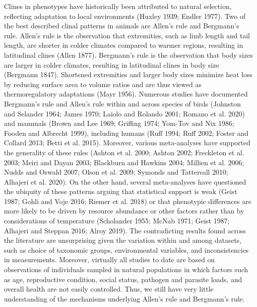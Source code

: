 \documentclass[
]{article}
\begin{document}
Clines in phenotypes have historically been attributed to natural
selection, reflecting adaptation to local environments (Huxley 1939;
Endler 1977). Two of the best described clinal patterns in animals are
Allen's rule and Bergmann's rule. Allen's rule is the observation that
extremities, such as limb length and tail length, are shorter in colder
climates compared to warmer regions, resulting in latitudinal clines
(Allen 1877). Bergmann's rule is the observation that body sizes are
larger in colder climates, resulting in latitudinal clines in body size
(Bergmann 1847). Shortened extremities and larger body sizes minimize
heat loss by reducing surface area to volume ratios and are thus viewed
as thermoregulatory adaptations (Mayr 1956). Numerous studies have
documented Bergmann's rule and Allen's rule within and across species of
birds (Johnston and Selander 1964; James 1970; Laiolo and Rolando 2001;
Romano et al. 2020) and mammals (Brown and Lee 1969; Griffing 1974;
Yom-Tov and Nix 1986; Fooden and Albrecht 1999), including humans (Ruff
1994; Ruff 2002; Foster and Collard 2013; Betti et al. 2015). Moreover,
various meta-analyses have supported the generality of these rules
(Ashton et al. 2000; Ashton 2002; Freckleton et al. 2003; Meiri and
Dayan 2003; Blackburn and Hawkins 2004; Millien et al. 2006; Nudds and
Oswald 2007; Olson et al. 2009; Symonds and Tattersall 2010; Alhajeri et
al. 2020). On the other hand, several meta-analyses have questioned the
ubiquity of these patterns arguing that statistical support is weak
(Geist 1987; Gohli and Voje 2016; Riemer et al. 2018) or that phenotypic
differences are more likely to be driven by resource abundance or other
factors rather than by considerations of temperature (Scholander 1955;
McNab 1971; Geist 1987; Alhajeri and Steppan 2016; Alroy 2019). The
contradicting results found across the literature are unsurprising given
the variation within and among datasets, such as choice of taxonomic
groups, environmental variables, and inconsistencies in measurements.
Moreover, virtually all studies to date are based on observations of
individuals sampled in natural populations in which factors such as age,
reproductive condition, social status, pathogen and parasite loads, and
overall health are not easily controlled. Thus, we still have very
little understanding of the mechanisms underlying Allen's rule and
Bergmann's rule.
\end{document}
